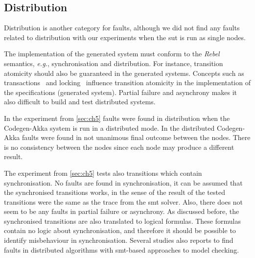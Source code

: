 \subsection{Distribution}
Distribution is another category for faults, although we did not find any faults
related to distribution with our experiments when the \gls{sut} is run as single
nodes.

The implementation of the generated system must conform to the
\textit{Rebel} semantics, \textit{e.g.}, synchronisation and distribution. For
instance, transition atomicity should also be guaranteed in the generated
systems. Concepts such as transactions~\cite[p.~6]{tanenbaum2017distributed} and
locking~\cite[p.~10]{tanenbaum2017distributed} influence transition atomicity in
the implementation of the specifications (generated system). Partial failure
and asynchrony makes it also difficult to build and test distributed
systems.~\cite[p.~1]{mccaffrey2016verification}

In the experiment from \autoref{sec:ch5} faults were found in
distribution when the Codegen-Akka system is run in a distributed mode. In the
distributed Codegen-Akka faults were found in not unanimous final outcome
between the nodes. There is no consistency between the nodes since each node may
produce a different result.

The experiment from \autoref{sec:ch5} tests also transitions which contain
synchronisation. No faults are found in synchronisation, it can be assumed that
the synchronised transitions works, in the sense of the result of the tested
transitions were the same as the trace from the \gls{smt} solver.
Also, there does not seem to be any faults in partial failure or asynchrony.
As discussed before, the synchronised transitions are also translated to logical
formulas.
These formulas contain no logic about synchronisation, and therefore it should
be possible to identify misbehaviour in synchronisation. Several studies also
reports to find faults in distributed algorithms with \gls{smt}-based approaches
to model checking.~\cite{konnov2015you, alberti2015smt, mccaffrey2016verification}
